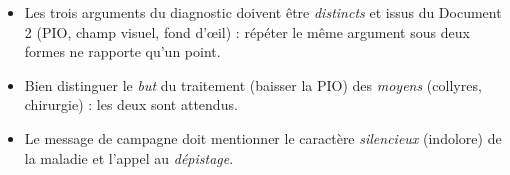 \documentclass[11pt]{article}
\begin{document}
\begin{attention}
\begin{itemize}
\item Les trois arguments du diagnostic doivent être \emph{distincts} et issus du Document 2 (PIO, champ visuel, fond d'œil) : répéter le même argument sous deux formes ne rapporte qu'un point.
\item Bien distinguer le \emph{but} du traitement (baisser la PIO) des \emph{moyens} (collyres, chirurgie) : les deux sont attendus.
\item Le message de campagne doit mentionner le caractère \emph{silencieux} (indolore) de la maladie et l'appel au \emph{dépistage}.
\end{itemize}
\end{attention}
\end{document}
